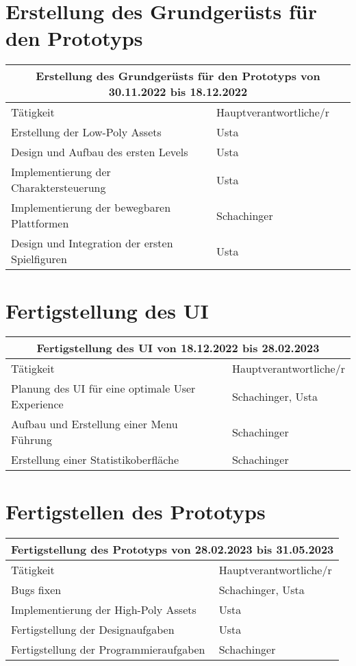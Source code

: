 \section{Erstellung des Grundgerüsts für den Prototyps}
\begin{tabular}{|m{}|m{}|}
\hline
\multicolumn{2}{|c|}{\textbf{Erstellung des Grundgerüsts für den Prototyps von 30.11.2022 bis 18.12.2022}} \\
\hline
Tätigkeit & Hauptverantwortliche/r \\
\hline
Erstellung der Low-Poly Assets & Usta \\
\hline
Design und Aufbau des ersten Levels & Usta \\
\hline
Implementierung der Charaktersteuerung & Usta \\
\hline
Implementierung der bewegbaren Plattformen & Schachinger \\
\hline
Design und Integration der ersten Spielfiguren & Usta \\
\hline
\end{tabular}

\section{Fertigstellung des UI}
\begin{tabular}{|m{}|m{}|}
\hline
\multicolumn{2}{|c|}{\textbf{Fertigstellung des UI von 18.12.2022 bis 28.02.2023}} \\
\hline
Tätigkeit & Hauptverantwortliche/r \\
\hline
Planung des UI für eine optimale User Experience & Schachinger, Usta \\
\hline
Aufbau und Erstellung einer Menu Führung & Schachinger \\
\hline
Erstellung einer Statistikoberfläche & Schachinger \\
\hline
\end{tabular}

\section{Fertigstellen des Prototyps}
\begin{tabular}{|m{}|m{}|}
\hline
\multicolumn{2}{|c|}{\textbf{Fertigstellung des Prototyps von 28.02.2023 bis 31.05.2023}} \\
\hline
Tätigkeit & Hauptverantwortliche/r \\
\hline
Bugs fixen & Schachinger, Usta \\
\hline
Implementierung der High-Poly Assets & Usta \\
\hline
Fertigstellung der Designaufgaben & Usta \\
\hline
Fertigstellung der Programmieraufgaben & Schachinger \\
\hline
\end{tabular}

